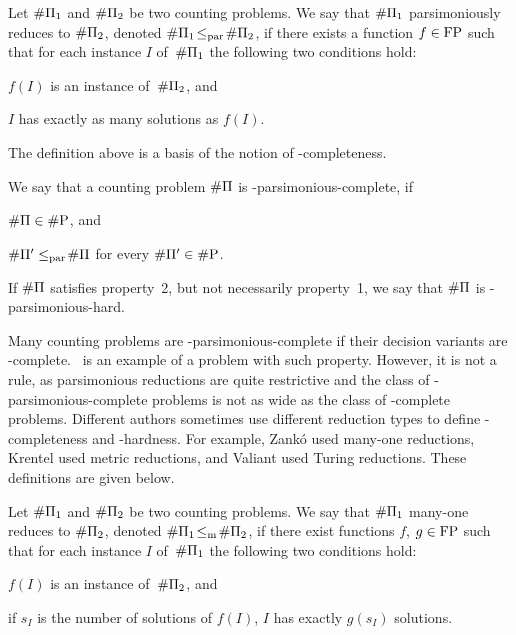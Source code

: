 \begin{definition}
    Let $\textnormal{\#}\Pi_1$ \!and $\textnormal{\#}\Pi_2$ \!be two counting problems.
	We say that $\textnormal{\#}\Pi_1$ parsimoniously reduces to $\textnormal{\#}\Pi_2$, denoted $\textnormal{\#}\Pi_1\!\le_\textnormal{par}\!\textnormal{\#}\Pi_2$, if there exists a function $f\in\textnormal{FP}$ such that for each instance $I$ \!of \,$\textnormal{\#}\Pi_1$ \!the following two conditions hold:
	\begin{Enumerate}
		\item $f(I)$ is an instance of \,$\textnormal{\#}\Pi_2$, and
		\item $I$ has exactly as many solutions as $f(I)$.
	\end{Enumerate}
\end{definition}

The definition above is a basis of the notion of \sharpPclass-completeness.

\begin{definition} \label{def:sharpPcomplete}
	We say that a counting problem $\textnormal{\#}\Pi$ is \sharpPclass-parsimonious-complete, if
	\begin{Enumerate}
		\item $\textnormal{\#}\Pi\in\textnormal{\#P}$, and
		\item $\textnormal{\#}\Pi'\le_\textnormal{par}\!\textnormal{\#}\Pi$ for every $\textnormal{\#}\Pi'\in\textnormal{\#P}$.
	\end{Enumerate}
	If $\textnormal{\#}\Pi$ satisfies property~2, but not necessarily property~1, we say that $\textnormal{\#}\Pi$ is \sharpPclass-parsimonious-hard.
\end{definition}

Many counting problems are \sharpPclass-parsimonious-complete if their decision variants are \NPclass-complete.
\sharpXthreeC\ is an example of a problem with such property.
However, it is not a rule, as parsimonious reductions are quite restrictive and the class of \sharpPclass-parsimonious-complete problems is not as wide as the class of \NPclass-complete problems.
Different authors sometimes use different reduction types to define \sharpPclass-completeness and \sharpPclass-hardness.
For example, Zank\'o \cite{zanko} used many-one reductions, Krentel \cite{krentel} used metric reductions, and Valiant \cite{valiant} used Turing reductions.
These definitions are given below.

\begin{definition}[Zank\'o]
    Let $\textnormal{\#}\Pi_1$ \!and $\textnormal{\#}\Pi_2$ \!be two counting problems.
	We say that $\textnormal{\#}\Pi_1$ many-one reduces to $\textnormal{\#}\Pi_2$, denoted $\textnormal{\#}\Pi_1\!\le_\textnormal{m}\!\textnormal{\#}\Pi_2$, if there exist functions $f$, $g\in\textnormal{FP}$ such that for each instance $I$ \!of \,$\textnormal{\#}\Pi_1$ \!the following two conditions hold:
	\begin{Enumerate}
		\item $f(I)$ is an instance of \,$\textnormal{\#}\Pi_2$, and
		\item if $s_I$ is the number of solutions of $f(I)$, $I$ has exactly $g(s_I)$ solutions.
	\end{Enumerate}
\end{definition}

